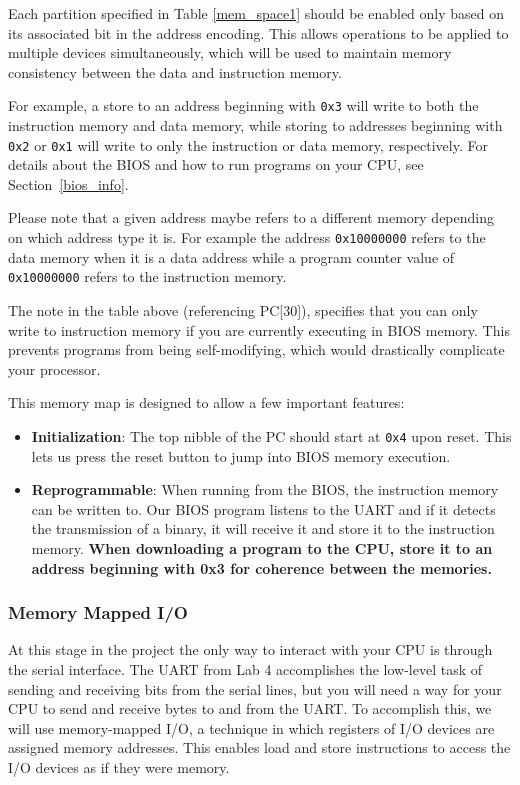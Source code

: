 \documentclass[11pt]{article}
\begin{document}
Each partition specified in Table \ref{mem_space1} should be enabled only based on its associated bit in the address encoding. This allows operations to be applied to multiple devices simultaneously, which will be used to maintain memory consistency between the data and instruction memory. 

For example, a store to an address beginning with \verb|0x3| will write to both the instruction memory and data memory, while storing to addresses beginning with \verb|0x2| or \verb|0x1| will write to only the instruction or data memory, respectively. For details about the BIOS and how to run programs on your CPU, see Section~\ref{bios_info}.

Please note that a given address maybe refers to a different memory depending on which address type it is. For example the address \verb|0x10000000| refers to the data memory when it is a data address while a program counter value of \verb|0x10000000| refers to the instruction memory.

The note in the table above (referencing PC[30]), specifies that you can only write to instruction memory if you are currently executing in BIOS memory. This prevents programs from being self-modifying, which would drastically complicate your processor.

This memory map is designed to allow a few important features:
\begin{itemize}
	\item \textbf{Initialization}: The top nibble of the PC should start at \verb|0x4| upon reset. This lets us press the reset button to jump into BIOS memory execution.
	
	\item \textbf{Reprogrammable}: When running from the BIOS, the instruction memory can be written to. Our BIOS program listens to the UART and if it detects the transmission of a binary, it will receive it and store it to the instruction memory.	\textbf{When downloading a program to the CPU, store it to an address beginning with 0x3 for coherence between the memories.}
\end{itemize}

\subsubsection{Memory Mapped I/O}
At this stage in the project the only way to interact with your CPU is through the serial interface. The UART from Lab 4 accomplishes the low-level task of sending and receiving bits from the serial lines, but you will need a way for your CPU to send and receive bytes to and from the UART. To accomplish this, we will use memory-mapped I/O, a technique in which registers of I/O devices are assigned memory addresses. This enables load and store instructions to access the I/O devices as if they were memory.
\end{document}
